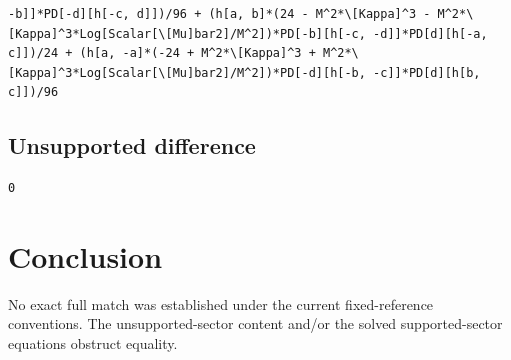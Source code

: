 \documentclass[11pt]{article}
\begin{document}
\begin{verbatim}
-b]]*PD[-d][h[-c, d]])/96 + (h[a, b]*(24 - M^2*\[Kappa]^3 - M^2*\[Kappa]^3*Log[Scalar[\[Mu]bar2]/M^2])*PD[-b][h[-c, -d]]*PD[d][h[-a, c]])/24 + (h[a, -a]*(-24 + M^2*\[Kappa]^3 + M^2*\[Kappa]^3*Log[Scalar[\[Mu]bar2]/M^2])*PD[-d][h[-b, -c]]*PD[d][h[b, c]])/96
\end{verbatim}
\subsection{Unsupported difference}
\begin{verbatim}
0
\end{verbatim}
\section{Conclusion}
No exact full match was established under the current fixed-reference conventions. The unsupported-sector content and/or the solved supported-sector equations obstruct equality.
\end{document}
